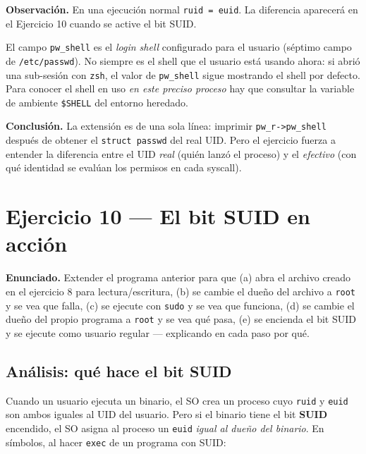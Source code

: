 \documentclass[11pt,a4paper]{article}
\begin{document}
\textbf{Observación.} En una ejecución normal \texttt{ruid = euid}.
La diferencia aparecerá en el Ejercicio 10 cuando se active el bit
SUID.

\begin{idea}
El campo \texttt{pw\_shell} es el \emph{login shell} configurado para
el usuario (séptimo campo de \texttt{/etc/passwd}). No siempre es el
shell que el usuario está usando ahora: si abrió una sub-sesión con
\texttt{zsh}, el valor de \texttt{pw\_shell} sigue mostrando el shell
por defecto. Para conocer el shell en uso \emph{en este preciso
proceso} hay que consultar la variable de ambiente \texttt{\$SHELL}
del entorno heredado.
\end{idea}

\textbf{Conclusión.} La extensión es de una sola línea: imprimir
\texttt{pw\_r->pw\_shell} después de obtener el \texttt{struct passwd}
del real UID. Pero el ejercicio fuerza a entender la diferencia entre
el UID \emph{real} (quién lanzó el proceso) y el \emph{efectivo} (con
qué identidad se evalúan los permisos en cada syscall).

\section{Ejercicio 10 --- El bit SUID en acción}

\textbf{Enunciado.} Extender el programa anterior para que (a) abra
el archivo creado en el ejercicio 8 para lectura/escritura, (b) se
cambie el dueño del archivo a \texttt{root} y se vea que falla, (c) se
ejecute con \texttt{sudo} y se vea que funciona, (d) se cambie el
dueño del propio programa a \texttt{root} y se vea qué pasa, (e) se
encienda el bit SUID y se ejecute como usuario regular --- explicando
en cada paso por qué.

\subsection*{Análisis: qué hace el bit SUID}

Cuando un usuario ejecuta un binario, el SO crea un proceso cuyo
\texttt{ruid} y \texttt{euid} son ambos iguales al UID del usuario.
Pero si el binario tiene el bit \textbf{SUID} encendido, el SO
asigna al proceso un \texttt{euid} \emph{igual al dueño del binario}.
En símbolos, al hacer \texttt{exec} de un programa con SUID:
\end{document}

